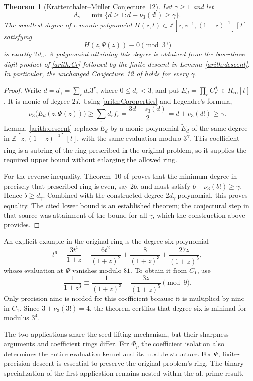 \documentclass[11pt,a4paper]{article}
\newtheorem{theorem}{Theorem}
\theoremstyle{definition}
\theoremstyle{remark}\newtheorem{remark}[lemma]{Remark}
\begin{document}
\begin{theorem}[Krattenthaler--M\"uller Conjecture~12]
\label{arith:cantorconjecture}
Let $\gamma\geq1$ and let
\[
 d_\gamma=\min\{d\geq1:d+\nu_3(d!)\geq\gamma\}.
\]
The smallest degree of a monic polynomial
$H(z,t)\in\mathbb Z[z,z^{-1},(1+z)^{-1}][t]$ satisfying
\[
 H(z,\Psi(z))\equiv0\pmod{3^\gamma}
\]
is exactly $2d_\gamma$. A polynomial attaining this degree is obtained
from the base-three digit product of \eqref{arith:Cr} followed by the
finite descent in Lemma~\ref{arith:descent}. In particular, the unchanged
Conjecture~12 of \cite{KM3} holds for every $\gamma$.
\end{theorem}
\begin{proof}
Write $d=d_\gamma=\sum_r d_r3^r$, where $0\leq d_r<3$, and put
$E_d=\prod_r C_r^{d_r}\in R_\infty[t]$. It is monic of degree $2d$.
Using \eqref{arith:Cproperties} and Legendre's formula,
\[
 \nu_3\bigl(E_d(z,\Psi(z))\bigr)
  \geq\sum_rd_rf_r
  =\frac{3d-s_3(d)}2
  =d+\nu_3(d!)\geq\gamma.
\]
Lemma~\ref{arith:descent} replaces $E_d$ by a monic polynomial
$\widetilde E_d$ of the same degree in
$\mathbb Z[z,(1+z)^{-1}][t]$, with the same evaluation modulo
$3^\gamma$. This coefficient ring is a subring of the ring prescribed
in the original problem, so it supplies the required upper bound
without enlarging the allowed ring.

For the reverse inequality, Theorem~10 of \cite{KM3} proves that the
minimum degree in precisely that prescribed ring is even, say $2b$,
and must satisfy $b+\nu_3(b!)\geq\gamma$. Hence $b\geq d_\gamma$.
Combined with the constructed degree-$2d_\gamma$ polynomial, this
proves equality. The cited lower bound is an established theorem;
the conjectural step in that source was attainment of the bound for
all $\gamma$, which the construction above provides.
\end{proof}

An explicit example in the original ring is the degree-six polynomial
\[
 t^6-\frac{3t^4}{1+z}-\frac{6t^2}{(1+z)^2}
       +\frac8{(1+z)^3}+\frac{27z}{(1+z)^5},
\]
whose evaluation at $\Psi$ vanishes modulo $81$. To obtain it from
$C_1$, use
\[
 \frac1{1+z^3}\equiv\frac1{(1+z)^3}
          +\frac{3z}{(1+z)^5}\pmod9.
\]
Only precision nine is needed for this coefficient because it is
multiplied by nine in $C_1$. Since $3+\nu_3(3!)=4$, the theorem
certifies that degree six is minimal for modulus $3^4$.

The two applications share the seed-lifting mechanism, but their sharpness
arguments and coefficient rings differ. For $\Phi_p$ the coefficient
isolation also determines the entire evaluation kernel and its module
structure. For $\Psi$, finite-precision descent is essential to preserve
the original problem's ring. The binary specialization of the first
application remains nested within the all-prime result.
\end{document}
